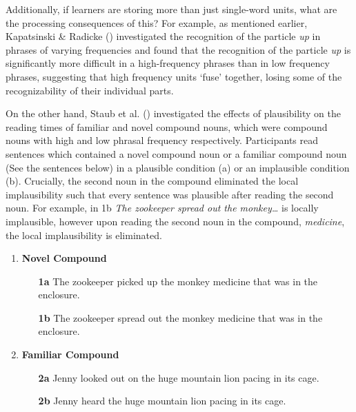\documentclass[
  12pt,
  letterpaper,
]{scrreprt}
\begin{document}
Additionally, if learners are storing more than just single-word units,
what are the processing consequences of this? For example, as mentioned
earlier, Kapatsinski \& Radicke
()
investigated the recognition of the particle \emph{up} in phrases of
varying frequencies and found that the recognition of the particle
\emph{up} is significantly more difficult in a high-frequency phrases
than in low frequency phrases, suggesting that high frequency units
`fuse' together, losing some of the recognizability of their individual
parts.

On the other hand, Staub et al.
() investigated the
effects of plausibility on the reading times of familiar and novel
compound nouns, which were compound nouns with high and low phrasal
frequency respectively. Participants read sentences which contained a
novel compound noun or a familiar compound noun (See the sentences
below) in a plausible condition (a) or an implausible condition (b).
Crucially, the second noun in the compound eliminated the local
implausibility such that every sentence was plausible after reading the
second noun. For example, in 1b \emph{The zookeeper spread out the
monkey\ldots{}} is locally implausible, however upon reading the second
noun in the compound, \emph{medicine}, the local implausibility is
eliminated.

\begin{enumerate} 

    \item \textbf{Novel Compound}
    \begin{enumerate}
        \item[\textbf{1a}] The zookeeper picked up the monkey medicine that was in the enclosure.
        \item[\textbf{1b}] The zookeeper spread out the monkey medicine that was in the enclosure.
    \end{enumerate} \label{staubsentencenovel}
    \item \textbf{Familiar Compound}
    \begin{enumerate}
        \item[\textbf{2a}] Jenny looked out on the huge mountain lion pacing in its cage. \label{familiarplaus}
        \item[\textbf{2b}] Jenny heard the huge mountain lion pacing in its cage. \label{familiarimplaus}
    \end{enumerate} \label{staubsentencefamiliar}
\end{enumerate}
\end{document}
